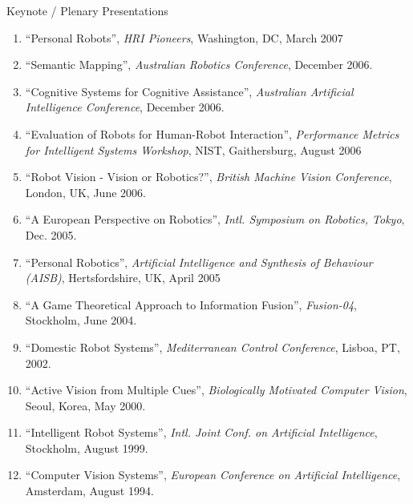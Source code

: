 \documentclass{article}
\begin{document}
\begin{cv}
\begin{cvlist}{Keynote / Plenary Presentations}
\begin{enumerate}
{    07}, Boston, MA, May 2007
  \item ``Personal Robots'', {\em HRI Pioneers}, Washington, DC, March
    2007
  \item ``Semantic Mapping'', {\em Australian Robotics Conference},
    December 2006.
  \item ``Cognitive Systems for Cognitive Assistance'', {\em
    Australian Artificial Intelligence Conference}, December 2006.
  \item ``Evaluation of Robots for Human-Robot Interaction'', {\em
    Performance Metrics for Intelligent Systems Workshop}, NIST,
    Gaithersburg, August 2006
  \item ``Robot Vision - Vision or Robotics?'', {\em British Machine
    Vision Conference}, London, UK, June 2006.
  \item ``A European Perspective on Robotics'', {\em Intl. Symposium
    on Robotics, Tokyo}, Dec. 2005.
  \item ``Personal Robotics'', {\em Artificial Intelligence and
    Synthesis of Behaviour (AISB)}, Hertsfordshire, UK, April 2005
  \item ``A Game Theoretical Approach to Information Fusion'', {\em
    Fusion-04}, Stockholm, June 2004.
  \item ``Domestic Robot Systems'', {\em Mediterranean Control
    Conference}, Lisboa, PT, 2002.
  \item ``Active Vision from Multiple Cues'', {\em Biologically
    Motivated Computer Vision}, Seoul, Korea, May 2000.
  \item ``Intelligent Robot Systems'', {\em Intl. Joint Conf. on
    Artificial Intelligence}, Stockholm, August 1999.
  \item ``Computer Vision Systems'', {\em European Conference on
    Artificial Intelligence}, Amsterdam, August 1994.
  \end{enumerate}
\end{cvlist}


\end{cv}
\end{document}

